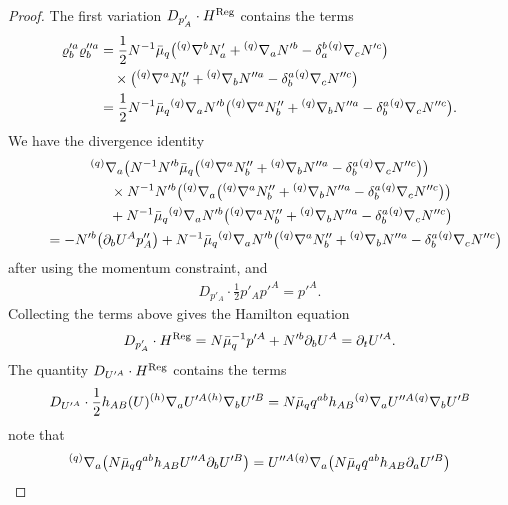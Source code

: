 \documentclass[11pt]{article}
\numberwithin{equation}{section}
\def\ptl{\partial}%
\def\grad{{\nabla}}%
\newcommand{\leftexp}[2]{{\vphantom{#2}}^{#1}{#2}}
\def\halb{\frac{1}{2}}%
\numberwithin{equation}{section}
\begin{document}
\begin{proof}
The first variation $D_{p'_A} \cdot H^{{\rm Reg}}$ contains the terms
\begin{align*}
\varrho'^a_b \varrho''^a_b &{}= \halb N^{-1} \bar{\mu}_q \bigl(\leftexp{(q)}{\grad}^b N'_a + \leftexp{(q)}{\grad}_a N'^b - \delta_a^b \leftexp{(q)}{\grad}_c N'^c\bigr) \notag\\
&\quad{}{} \times \bigl(\leftexp{(q)}{\grad}^a N''_b + \leftexp{(q)}{\grad}_b N''^a - \delta_b^a \leftexp{(q)}{\grad}_c N''^c\bigr) \notag\\
&{}= \halb N^{-1} \bar{\mu}_q \leftexp{(q)}{\grad}_a N'^b \bigl(\leftexp{(q)}{\grad}^a N''_b + \leftexp{(q)}{\grad}_b N''^a - \delta_b^a \leftexp{(q)}{\grad}_c N''^c\bigr).
\end{align*}
We have the divergence identity
\begin{gather*}
 \leftexp{(q)}{\grad}_a \bigl(N^{-1} N'^b \bar{\mu}_q \bigl(\leftexp{(q)}{\grad}^a N''_b + \leftexp{(q)}{\grad}_b N''^a - \delta_b^a \leftexp{(q)}{\grad}_c N''^c\bigr)\bigr) \notag\\
\qquad\quad{}\times N^{-1} N'^b \bigl(\leftexp{(q)}{\grad}_a \bigl(\leftexp{(q)}{\grad}^a N''_b + \leftexp{(q)}{\grad}_b N''^a - \delta_b^a \leftexp{(q)}{\grad}_c N''^c\bigr)\bigr) \notag\\
\qquad\quad{}+ N^{-1} \bar{\mu}_q \leftexp{(q)}{\grad}_a N'^b \bigl(\leftexp{(q)}{\grad}^a N''_b + \leftexp{(q)}{\grad}_b N''^a - \delta_b^a \leftexp{(q)}{\grad}_c N''^c\bigr) \notag\\
\qquad{}= -N'^b \bigl(\ptl_b U^A p''_A\bigr) + N^{-1} \bar{\mu}_q \leftexp{(q)}{\grad}_a N'^b \bigl(\leftexp{(q)}{\grad}^a N''_b + \leftexp{(q)}{\grad}_b N''^a - \delta_b^a \leftexp{(q)}{\grad}_c N''^c\bigr)
\end{gather*}
after using the momentum constraint, and
\begin{align*}
D_{p'_A} \cdot \halb p'_A p'^A = p'^A.
\end{align*}
Collecting the terms above gives the Hamilton equation
\begin{align*}
D_{p'_A} \cdot H^{{\rm Reg}} = N \bar{\mu}^{-1}_q p'^A + N'^b \ptl_b U^A
= \ptl_t U'^A.
\end{align*}
The quantity $D_{U'^A} \cdot H^{{\rm Reg}}$ contains the terms
\[
D_{U'^A} \cdot \halb h_{AB}(U) \leftexp{(h)}{\grad}_a U'^A \leftexp{(h)}{\grad}_b U'^B = N \bar{\mu}_q q^{ab} h_{AB} \leftexp{(q)}{\grad}_a U''^A \leftexp{(q)}{\grad}_b U'^B \]
note that
\begin{align*}
\leftexp{(q)}{\grad}_a \bigl(N \bar{\mu}_q q^{ab} h_{AB} U''^A \ptl_b U'^B\bigr)&{}= U''^A \leftexp{(q)}{\grad}_a \bigl(N \bar{\mu}_q q^{ab} h_{AB} \ptl_a U'^B\bigr) \\

\end{align*}
\end{proof}
\end{document}
